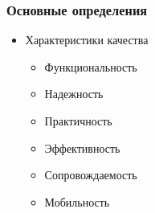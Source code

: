 \documentclass{beamer}
\begin{document}
\begin{frame}
\frametitle{Основные определения}
    \begin{itemize}
        \item Характеристики качества
            \begin{itemize}
                \item Функциональность
                \item Надежность
                \item Практичность
                \item Эффективность
                \item Сопровождаемость
                \item Мобильность
            \end{itemize}
    \end{itemize}
\end{frame}

\setcounter{framenumber}{\value{finalframe}}
\end{document}
